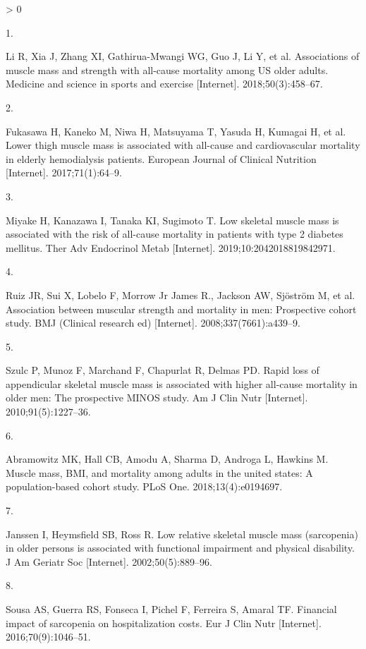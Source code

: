 \documentclass[twoside,10pt]{gihclass} %
\newlength{\cslhangindent}
\newlength{\csllabelwidth}
\newenvironment{CSLReferences}[3] %
 {%
  \setlength{\parindent}{0pt}
  \ifodd #1 \everypar{\setlength{\hangindent}{\cslhangindent}}\ignorespaces\fi
  \ifnum #2 > 0
  \setlength{\parskip}{#2\baselineskip}
  \fi
 }%
 {}
\newcommand{\CSLLeftMargin}[1]{\parbox[t]{\maxof{\widthof{#1}}{\csllabelwidth}}{#1}}
\newcommand{\CSLRightInline}[1]{\parbox[t]{\linewidth}{#1}}
\begin{document}
\hypertarget{refs}{}
\begin{CSLReferences}{0}{0}
\leavevmode\hypertarget{ref-RN2512}{}%
\CSLLeftMargin{1. }
\CSLRightInline{Li R, Xia J, Zhang XI, Gathirua-Mwangi WG, Guo J, Li Y, et al. Associations of muscle mass and strength with all-cause mortality among US older adults. Medicine and science in sports and exercise {[}Internet{]}. 2018;50(3):458--67. }

\leavevmode\hypertarget{ref-RN2513}{}%
\CSLLeftMargin{2. }
\CSLRightInline{Fukasawa H, Kaneko M, Niwa H, Matsuyama T, Yasuda H, Kumagai H, et al. Lower thigh muscle mass is associated with all-cause and cardiovascular mortality in elderly hemodialysis patients. European Journal of Clinical Nutrition {[}Internet{]}. 2017;71(1):64--9. }

\leavevmode\hypertarget{ref-RN2514}{}%
\CSLLeftMargin{3. }
\CSLRightInline{Miyake H, Kanazawa I, Tanaka KI, Sugimoto T. Low skeletal muscle mass is associated with the risk of all-cause mortality in patients with type 2 diabetes mellitus. Ther Adv Endocrinol Metab {[}Internet{]}. 2019;10:2042018819842971. }

\leavevmode\hypertarget{ref-RN2376}{}%
\CSLLeftMargin{4. }
\CSLRightInline{Ruiz JR, Sui X, Lobelo F, Morrow Jr James R., Jackson AW, Sjöström M, et al. Association between muscular strength and mortality in men: Prospective cohort study. BMJ (Clinical research ed) {[}Internet{]}. 2008;337(7661):a439--9. }

\leavevmode\hypertarget{ref-RN2515}{}%
\CSLLeftMargin{5. }
\CSLRightInline{Szulc P, Munoz F, Marchand F, Chapurlat R, Delmas PD. Rapid loss of appendicular skeletal muscle mass is associated with higher all-cause mortality in older men: The prospective MINOS study. Am J Clin Nutr {[}Internet{]}. 2010;91(5):1227--36. }

\leavevmode\hypertarget{ref-RN2516}{}%
\CSLLeftMargin{6. }
\CSLRightInline{Abramowitz MK, Hall CB, Amodu A, Sharma D, Androga L, Hawkins M. Muscle mass, BMI, and mortality among adults in the united states: A population-based cohort study. PLoS One. 2018;13(4):e0194697. }

\leavevmode\hypertarget{ref-RN2517}{}%
\CSLLeftMargin{7. }
\CSLRightInline{Janssen I, Heymsfield SB, Ross R. Low relative skeletal muscle mass (sarcopenia) in older persons is associated with functional impairment and physical disability. J Am Geriatr Soc {[}Internet{]}. 2002;50(5):889--96. }

\leavevmode\hypertarget{ref-RN2532}{}%
\CSLLeftMargin{8. }
\CSLRightInline{Sousa AS, Guerra RS, Fonseca I, Pichel F, Ferreira S, Amaral TF. Financial impact of sarcopenia on hospitalization costs. Eur J Clin Nutr {[}Internet{]}. 2016;70(9):1046--51. }


\end{CSLReferences}
\end{document}
